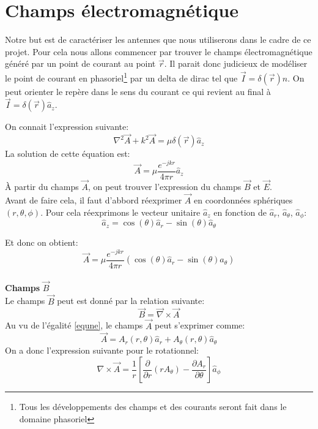 \documentclass[10pt,a4paper]{article}
\begin{document}
\section{Champs électromagnétique}
Notre but est de caractériser les antennes que nous utiliserons dans le cadre de ce projet. Pour cela nous allons commencer par trouver le champs électromagnétique généré par un point de courant au point $\overrightarrow{r}$. Il parait donc judicieux de modéliser le point de courant en phasoriel\footnote{Tous les développements des champs et des courants seront fait dans le domaine phasoriel} par un delta de dirac tel que $\overrightarrow{I}=\delta (\overrightarrow{r})\widehat{n}$. On peut orienter le repère dans le sens du courant ce qui revient au final à $\overrightarrow{I}=\delta (\overrightarrow{r})\widehat{a}_z$.

On connait l'expression suivante:
$$\nabla^2 \overrightarrow{A}+k^2 \overrightarrow{A}=\mu \delta (\overrightarrow{r}) \widehat{a}_z$$
La solution de cette équation est:
$$\overrightarrow{A}=\mu \dfrac{e^{-jkr}}{4\pi r}\widehat{a}_z$$
À partir du champs $\overrightarrow{A}$, on peut trouver l'expression du champs $\overrightarrow{B}$ et $\overrightarrow{E}$.\\
Avant de faire cela, il faut d'abbord réexprimer $\overrightarrow{A}$ en coordonnées sphériques $(r,\theta , \phi)$. Pour cela réexprimons le vecteur unitaire $\widehat{a}_z$ en fonction de $\widehat{a}_r$, $\widehat{a}_\theta$, $\widehat{a}_\phi$:
$$\widehat{a}_z=\cos(\theta)\widehat{a}_r-\sin(\theta)\widehat{a}_\theta$$

Et donc on obtient:
\begin{equation}\label{equne}
\overrightarrow{A}=\mu \dfrac{e^{-jkr}}{4\pi r} (\cos(\theta)\widehat{a}_r-\sin(\theta)\widehat{a}_\theta)
\end{equation}
\\

\indent \textbf{Champs} $\overrightarrow{B}$\\
Le champs $\overrightarrow{B}$ peut est donné par la relation suivante:
$$\overrightarrow{B}=\overrightarrow{\nabla}\times \overrightarrow{A}$$
Au vu de l'égalité \ref{equne}, le champs $\overrightarrow{A}$ peut s'exprimer comme:
$$\overrightarrow{A}=A_{r}(r,\theta)\widehat{a}_r+A_{\theta}(r,\theta)\widehat{a}_\theta$$
On a donc l'expression suivante pour le rotationnel:
$$\nabla \times \overrightarrow{A}= \dfrac{1}{r} \left[ \dfrac{\partial}{\partial r} (r A_{\theta}) - \dfrac{\partial A_r}{\partial \theta} \right]\widehat{a}_{\phi}$$
\end{document}
